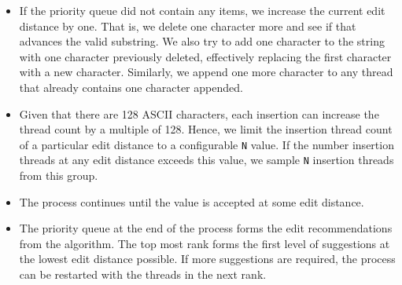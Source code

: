 \documentclass[sigconf,review,anonymous]{acmart}
\makeatletter
\def\<#1>{\texttt{#1}}
\newcommand{\approach}{\textsc{BRepair}\xspace}
\newcommand{\ddmax}{\textit{DDMax}\xspace}
\newcommand\letterboxed[1]{%
\setlength{\fboxsep}{0pt}%
  \@tfor\@ii:=#1\do{%
    \fcolorbox{white}{light-gray}{\texttt{\strut\@ii}}%
  }%
}
\makeatother
\begin{document}
\begin{itemize}
\item If the priority queue did not contain any items, we increase the current
edit distance by one. That is, we delete one character more and see if that
advances the valid substring. We also try to add one character to the string
with one character previously deleted, effectively replacing the first
character with a new character. Similarly, we append one more character to any
thread that already contains one character appended.

\item Given that there are 128 ASCII characters, each insertion can increase
the thread count by a multiple of 128. Hence, we limit the insertion thread
count of a particular edit distance to a configurable \<N> value. If the number
insertion threads at any edit distance exceeds this value, we sample \<N>
insertion threads from this group.

\item The process continues until the value is accepted at some edit distance.

\item The priority queue at the end of the process forms the edit
recommendations from the algorithm. The top most rank forms the first level of
suggestions at the lowest edit distance possible. If more suggestions are
required, the process can be restarted with the threads in the next rank.

\end{itemize}



%
\end{document}
